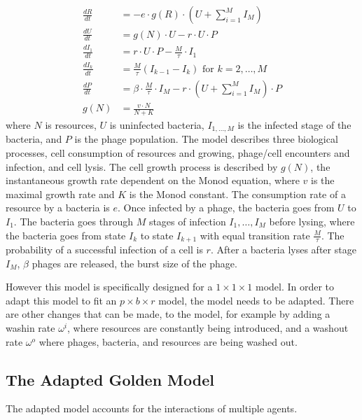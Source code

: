 \begin{align}
    \frac{dR}{dt} &= -e \cdot g(R)\cdot (U + \sum_{i=1}^{M} I_M)\\
    \frac{dU}{dt} &= g(N)\cdot U - r\cdot U \cdot P\\
    \frac{dI_1}{dt} &= r\cdot U \cdot P - \frac{M}{\tau}\cdot I_1 \\
    \frac{dI_k}{dt} &= \frac{M}{\tau}(I_{k-1}-I_k) \text{ for } k=2, \dots, M \\
    \frac{dP}{dt} &= \beta \cdot\frac{M}{\tau} \cdot I_M - r\cdot(U + \sum_{i=1}^{M} I_M)\cdot P \\
    g(N) &= \frac{v\cdot N}{N + K}
\end{align}where $N$ is resources, $U$ is uninfected bacteria, $I_{1, \dots, M}$ is the infected stage of the bacteria, and $P$ is the phage population. \newline
The model describes three biological processes, cell consumption of resources and growing, phage/cell encounters and infection, and cell lysis. 
The cell growth process is described by $g(N)$, the instantaneous growth rate dependent on the Monod equation, where $v$ is the maximal growth rate and $K$ is the Monod constant. 
The consumption rate of a resource by a bacteria is $e$. \newline
Once infected by a phage, the bacteria goes from $U$ to $I_1$. 
The bacteria goes through $M$ stages of infection $I_1, \dots, I_M$ before lysing, where the bacteria goes from state $I_k$ to state $I_{k+1}$ with equal transition rate $\frac{M}{\tau}$. The probability of a successful infection of a cell is $r$. \newline
After a bacteria lyses after stage $I_M$, $\beta$ phages are released, the burst size of the phage. 

However this model is specifically designed for a $1\times 1 \times 1$ model. 
In order to adapt this model to fit an $p \times b \times r$ model, the model needs to be adapted. 
There are other changes that can be made, to the model, for example by adding a washin rate $\omega^{i}$, where resources are constantly being introduced, and a washout rate $\omega^{o}$ where phages, bacteria, and resources are being washed out. 

\subsection{The Adapted Golden Model}
\label{sec:adapted_golden_model}
The adapted model accounts for the interactions of multiple agents. 

